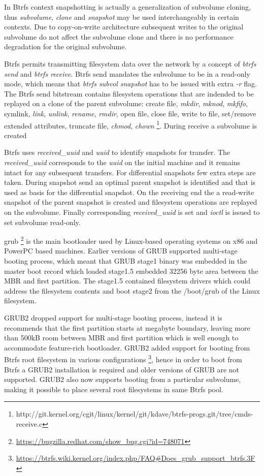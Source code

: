 \documentclass[a4paper,11pt]{kth-mag}
\begin{document}
In Btrfs context snapshotting is actually 
a generalization of subvolume cloning,
thus \emph{subvolume}, \emph{clone} and \emph{snapshot} may be used
interchangeably in certain contexts.
Due to copy-on-write architecture subsequent writes
to the original subvolume do not affect
the subvolume clone and there is no performance
degradation for the original subvolume.

Btrfs permits transmitting filesystem data over the network
by a concept of \emph{btrfs send} and \emph{btrfs receive}.
Btrfs send mandates the subvolume to be in a read-only mode,
which means that \emph{btrfs subvol snapshot} has to be issued
with extra \emph{-r} flag.
The Btrfs send bitstream contains filesystem operations that are
indended to be replayed on a clone of the parent subvolume:
create file, \emph{mkdir}, \emph{mknod}, \emph{mkfifo}, symlink,
\emph{link}, \emph{unlink}, \emph{rename}, \emph{rmdir}, open file,
close file, write to file, set/remove extended attributes,
truncate file, \emph{chmod}, \emph{chown}
\footnote{http://git.kernel.org/cgit/linux/kernel/git/kdave/btrfs-progs.git/tree/cmds-receive.c}.
During receive a subvolume is created 

Btrfs uses \emph{received\_uuid} and \emph{uuid} to
identify snapshots for transfer.
The \emph{received\_uuid} corresponds to the \emph{uuid} on
the initial machine and it remains intact for any subsequent transfers.
For differential snapshots few extra steps are taken.
During snapshot send an optimal parent snapshot is
identified and that is used as basis for the differential snapshot.
On the receiving end the a read-write snapshot of the parent
snapshot is created and filesystem operations
are replayed on the subvolume.
Finally corresponding \emph{received\_uuid} is set and
\emph{ioctl} is issued to set subvolume read-only.


\gls{grub}
\footnote{\url{https://bugzilla.redhat.com/show_bug.cgi?id=748071}}
is the main bootloader used
by Linux-based operating systems on x86 and PowerPC based machines.
Earlier versions of GRUB supported multi-stage booting process,
which meant that GRUB stage1 binary was embedded in the
master boot record which loaded stage1.5 embedded
32256 byte area between the MBR and first partition.
The stage1.5 contained filesystem drivers which could
address the filesystem contents and boot stage2 from
the /boot/grub of the Linux filesystem.

GRUB2 dropped support for multi-stage booting process,
instead it is recommends that the first partition
starts at megabyte boundary, leaving
more than 500kB room between MBR
and first partition which is well enough to accommodate
feature-rich bootloader.
GRUB2 added support for booting from Btrfs root filesystem
in various configurations
\footnote{\url{https://btrfs.wiki.kernel.org/index.php/FAQ\#Does_grub_support_btrfs.3F}},
hence in order to boot from
Btrfs a GRUB2 installation is required and older versions of
GRUB are not supported.
GRUB2 also now supports booting from a particular subvolume,
making it possible to place several root filesystems
in same Btrfs pool.
\end{document}
